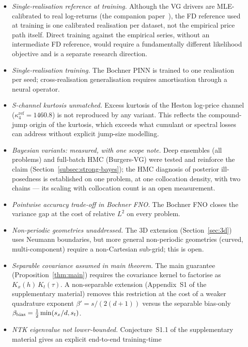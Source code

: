 \documentclass[review,12pt]{elsarticle}
\begin{document}
\begin{itemize}
\item \emph{Single-realisation reference at training.} Although the
VG drivers are MLE-calibrated to real log-returns
(the companion paper~\citep{Lipski2026RealWorld}), the FD reference used at training is
one calibrated realisation per dataset, not the empirical price path
itself. Direct training against the empirical series, without an
intermediate FD reference, would require a fundamentally different
likelihood objective and is a separate research direction.
\item \emph{Single-realisation training.} The Bochner PINN is
trained to one realisation per seed; cross-realisation
generalisation requires amortisation through a neural operator.
\item \emph{S-channel kurtosis unmatched.} Excess kurtosis of
the Heston log-price channel (\(\kappa_4^{\mathrm{ref}} = 1460.8\))
is not reproduced by any variant. This reflects the compound-jump
origin of the kurtosis, which exceeds what cumulant or spectral
losses can address without explicit jump-size modelling.
\item \emph{Bayesian variants: measured, with one scope note.} Deep
ensembles (all problems) and full-batch HMC (Burgers-VG) were tested and
reinforce the claim (Section~\ref{subsec:strong-bayes}); the HMC diagnosis
of posterior ill-posedness is established on one problem, at one
collocation density, with two chains --- its scaling with collocation
count is an open measurement.
\item \emph{Pointwise accuracy trade-off in Bochner FNO.} The
Bochner FNO closes the variance gap at the cost of relative
$L^2$ on every problem.
\item \emph{Non-periodic geometries unaddressed.} The 3D extension
(Section~\ref{sec:3d}) uses Neumann boundaries, but more general
non-periodic geometries (curved, multi-component) require a
non-Cartesian sub-grid; this is open.
\item \emph{Separable covariance assumed in main theorem.} The main
guarantee (Proposition~\ref{thm:main}) requires the covariance kernel
to factorise as $K_x(h)\,K_t(\tau)$. A non-separable extension
(Appendix~S1 of the supplementary material)
removes this restriction at the cost of a weaker quadrature exponent
$\beta'=s/(2(d+1))$ versus the separable bias-only
$\beta_{\rm bias}=\tfrac{1}{2}\min(s_x/d,s_t)$.
\item \emph{NTK eigenvalue not lower-bounded.}
Conjecture~S1.1 of the supplementary material gives an explicit end-to-end training-time

\end{itemize}
\end{document}
